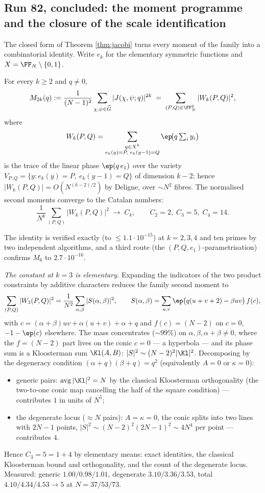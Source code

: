 \subsection{Run 82, concluded: the moment programme and the closure of the
scale identification}\label{sub:r82e}

The closed form of Theorem \ref{thm:jacobi} turns every moment of the family
into a combinatorial identity.  Write $e_k$ for the elementary symmetric
functions and $X=\FF_N\setminus\{0,1\}$.

\begin{theorem}\label{thm:momentpattern}
For every $k\ge2$ and $q\neq0$,
\[
  M_{2k}(q):=\frac{1}{(N-1)^2}\sum_{\chi,\psi\in\widehat G}|J(\chi,\psi;q)|^{2k}
  \;=\;\sum_{(P,Q)\in\FF_N^2}|W_k(P,Q)|^2,
\]
where
\[
  W_k(P,Q)=\sum_{\substack{y\in X^k\\ e_k(y)=P,\; e_k(y-1)=Q}}\ep\!\bigl(q\textstyle\sum_i y_i\bigr)
\]
is the trace of the linear phase $\ep(q\,e_1)$ over the variety
$V_{P,Q}=\{y:e_k(y)=P,\ e_k(y-1)=Q\}$ of dimension $k-2$; hence
$|W_k(P,Q)|=O(N^{(k-2)/2})$ by Deligne, over $\sim N^2$ fibres.  The
normalised second moments converge to the Catalan numbers:
\[
  \frac{1}{N^k}\sum_{(P,Q)}|W_k(P,Q)|^2\;\longrightarrow\;C_k,
  \qquad C_2=2,\; C_3=5,\; C_4=14.
\]
\end{theorem}

The identity is verified exactly (to $\le1.1\cdot10^{-15}$) at $k=2,3,4$ and
ten primes by two independent algorithms, and a third route (the
$(P,Q,e_1)$-parametrisation) confirms $M_6$ to $2.7\cdot10^{-16}$.

\emph{The constant at $k=3$ is elementary.}  Expanding the indicators of the
two product constraints by additive characters reduces the family second
moment to
\[
  \sum_{(P,Q)}|W_3(P,Q)|^2=\frac1{N^2}\sum_{\alpha,\beta}
  |S(\alpha,\beta)|^2,\qquad
  S(\alpha,\beta)=\sum_{u,v} \ep\bigl(q(u+v+2)-\beta uv\bigr)\,f(c),
\]
with $c=(\alpha+\beta)uv+\alpha(u+v)+\alpha+q$ and $f(c)=(N-2)$ on $c=0$,
$-1-\ep(c)$ elsewhere.  The mass concentrates ($\sim99\%$) on
$\alpha,\beta,\alpha+\beta\neq0$, where the $f=(N-2)$ part lives on the conic
$c=0$ --- a hyperbola --- and its phase sum is a Kloosterman sum
$\Kl(A,B)$: $|S|^2\sim(N-2)^2|\Kl|^2$.  Decomposing by the degeneracy
condition $(\alpha+q)(\beta+q)=q^2$ (equivalently $A=0$ or $\kappa=0$):
\begin{itemize}
\item generic pairs: $\operatorname{avg}|\Kl|^2=N$ by the classical
Kloosterman orthogonality (the two-to-one conic map cancelling the half of
the square condition) --- contributes $1$ in units of $N^5$;
\item the degenerate locus ($\approx N$ pairs): $A=\kappa=0$, the conic
splits into two lines with $2N-1$ points, $|S|^2\sim(N-2)^2(2N-1)^2\sim4N^4$
per point --- contributes $4$.
\end{itemize}
Hence $C_3=5=1+4$ by elementary means: exact identities, the classical
Kloosterman bound and orthogonality, and the count of the degenerate locus.
Measured: generic $1.00/0.98/1.01$, degenerate $3.10/3.36/3.53$, total
$4.10/4.34/4.53\to5$ at $N=37/53/73$.

